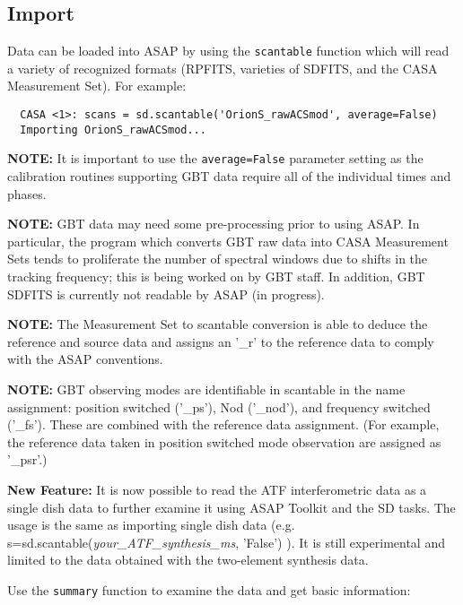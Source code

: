 \subsection{Import}
\label{subsection:sd.asap.import}

Data can be loaded into ASAP by using the {\tt scantable} function
which will read a variety of recognized formats (RPFITS, varieties of
SDFITS, and the CASA Measurement Set). For example:


\small
\begin{verbatim}
  CASA <1>: scans = sd.scantable('OrionS_rawACSmod', average=False)
  Importing OrionS_rawACSmod...
\end{verbatim}
\normalsize

{\bf NOTE:} It is important to use the {\tt average=False} parameter
setting as the calibration routines supporting GBT data require all of
the individual times and phases.

{\bf NOTE:} GBT data may need some pre-processing prior to using
ASAP. In particular, the program which converts GBT raw data into CASA
Measurement Sets tends to proliferate the number of spectral windows
due to shifts in the tracking frequency; this is being worked on by
GBT staff. In addition, GBT SDFITS is currently not readable by ASAP
(in progress).

{\bf NOTE:} The Measurement Set to scantable conversion is able to deduce
the reference and source data and assigns an '\_r' to the reference
data to comply with the ASAP conventions.

{\bf NOTE:} GBT observing modes are identifiable in scantable in the
name assignment: position switched ('\_ps'), Nod ('\_nod'), and
frequency switched ('\_fs'). These are combined with the reference data
assignment. (For example, the reference data taken in position
switched mode observation are assigned as '\_psr'.)

{\bf New Feature:} It is now possible to read the ATF interferometric
data as a single dish data to further examine it using ASAP Toolkit and
the SD tasks. The usage is the same as importing single
dish data (e.g. s=sd.scantable({\it your\_ATF\_synthesis\_ms}, 'False') ). 
It is still experimental and limited to the data obtained with the 
two-element synthesis data.

Use the {\tt summary} function to examine the data and get basic information:

